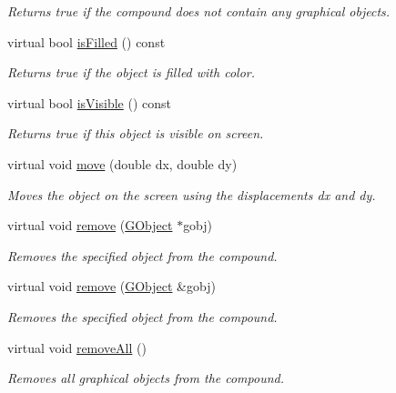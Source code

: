 \begin{DoxyCompactItemize}
\begin{DoxyCompactList}\small\item\em Returns true if the compound does not contain any graphical objects. \end{DoxyCompactList}\item 
virtual bool \mbox{\hyperlink{classGObject_a11c404f106940c201b6f326e0355c150}{is\+Filled}} () const
\begin{DoxyCompactList}\small\item\em Returns {\ttfamily true} if the object is filled with color. \end{DoxyCompactList}\item 
virtual bool \mbox{\hyperlink{classGObject_a9d8a6cfb13917785c143e74d40e4e2be}{is\+Visible}} () const
\begin{DoxyCompactList}\small\item\em Returns {\ttfamily true} if this object is visible on screen. \end{DoxyCompactList}\item 
virtual void \mbox{\hyperlink{classGObject_a5973d8dda83afb36e2c56855515be392}{move}} (double dx, double dy)
\begin{DoxyCompactList}\small\item\em Moves the object on the screen using the displacements {\ttfamily dx} and {\ttfamily dy}. \end{DoxyCompactList}\item 
virtual void \mbox{\hyperlink{classGCompound_a49dc57a2ce4caa354a5fff6acdde2e7d}{remove}} (\mbox{\hyperlink{classGObject}{G\+Object}} $\ast$gobj)
\begin{DoxyCompactList}\small\item\em Removes the specified object from the compound. \end{DoxyCompactList}\item 
virtual void \mbox{\hyperlink{classGCompound_a0c0ae4d69b584602ff3cba0d9cf330a4}{remove}} (\mbox{\hyperlink{classGObject}{G\+Object}} \&gobj)
\begin{DoxyCompactList}\small\item\em Removes the specified object from the compound. \end{DoxyCompactList}\item 
virtual void \mbox{\hyperlink{classGCompound_a9b0a5a3ad9972ab0e8eb0b54873aac6b}{remove\+All}} ()
\begin{DoxyCompactList}\small\item\em Removes all graphical objects from the compound. \end{DoxyCompactList}\item 

\end{DoxyCompactItemize}
